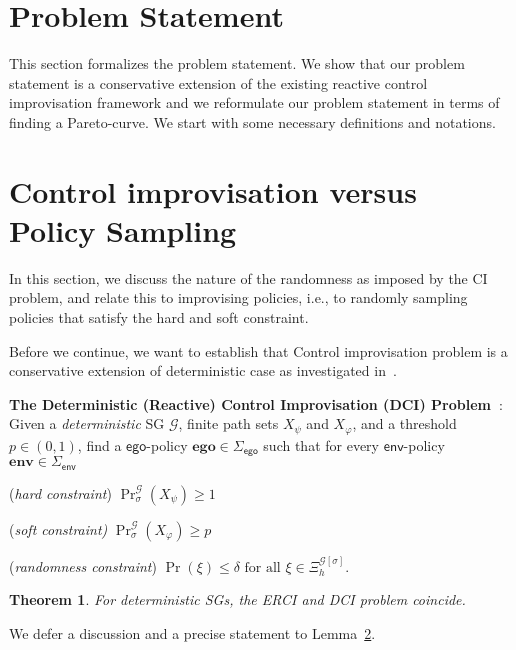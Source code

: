 \documentclass[conference]{IEEEtran}
\newtheorem{theorem}{Theorem}
\theoremstyle{remark}
\newcommand{\sg}{\mathcal{G}}
\renewcommand{\path}{\xi}
\newcommand{\eventually}[1]{\lozenge^{\leq #1}}
\newcommand{\sched}{\sigma}
\newcommand{\scthreshold}{p}
\newcommand{\pOneSched}{\mathbf{ego}}
\newcommand{\POneScheds}{\Sigma_\pOne}
\newcommand{\PTwoScheds}{\Sigma_\pTwo}
\newcommand{\pTwoSched}{\mathbf{env}}
\newcommand{\pOne}{\mathsf{ego}}
\newcommand{\pTwo}{\mathsf{env}}
\newcommand{\pathslbl}{\Xi}
\newcommand{\Paths}[2][]{\pathslbl^{#2}_{#1}}
\begin{document}
\section{Problem Statement}
This section formalizes the problem statement. We show that our problem statement is a conservative extension of the existing reactive control improvisation framework and we reformulate our problem statement in terms of finding a Pareto-curve. We start with some necessary definitions and notations.



\section{Control improvisation versus Policy Sampling}
In this section, we discuss the nature of the randomness as imposed by the CI problem, and relate this to improvising policies, i.e., to randomly sampling policies that satisfy the hard and soft constraint.


Before we continue, we want to establish that Control improvisation problem is a conservative extension of deterministic case as investigated in~\cite{}.
\begin{mdframed}
\textbf{The Deterministic (Reactive) Control Improvisation (DCI) Problem~\cite{}}:
Given a \emph{deterministic} SG $\sg$, finite path sets $X_\psi$ and $X_\varphi$, and a threshold $p \in (0,1)$,  find a $\pOne$-policy $\pOneSched \in \POneScheds$  such that for every $\pTwo$-policy $\pTwoSched \in \PTwoScheds$ 
\begin{compactenum}
\item (\emph{hard constraint}) $\Pr^\sg_{\sched}(X_\psi) \geq 1$
	\item (\emph{soft constraint)} $\Pr^\sg_{\sched}(X_\varphi) \geq \scthreshold$
	\item (\emph{randomness constraint}) $\Pr(\path) \leq \delta \text{ for all } \path \in \Paths[h]{\sg[\sched]}$.
\end{compactenum}
\end{mdframed}

\begin{theorem}
	For deterministic SGs, the ERCI and DCI problem coincide.
\end{theorem}
We defer a discussion and a precise statement to Lemma~\ref{}.

%
\end{document}
